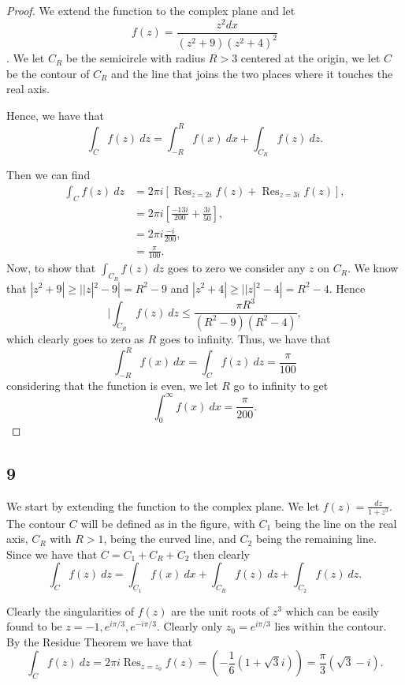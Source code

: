\documentclass{article}
\DeclareMathOperator*{\Res}{Res}
\begin{document}
\begin{proof}
    We extend the function to the complex plane and let
    \[f(z) = \frac{z^2 dx}{(z^2 + 9)(z^2 + 4)^2}\]. We let $C_R$ be the
    semicircle with radius $R > 3$ centered at the origin, we let $C$ be the
    contour of $C_R$ and the line that joins the two places where it touches
    the real axis.

    Hence, we have that
    \[\int_C f(z) \ dz = \int_{-R}^R f(x) \ dx + \int_{C_R} f(z) \ dz.\]

    Then we can find
    \begin{align*}
        \int_C f(z) \ dz & = 2\pi i\left[\Res_{z=2i} f(z) + \Res_{z=3i} f(z)\right], \\
                         & =2\pi i\left[\frac{-13i}{200} + \frac{3i}{50}\right],     \\
                         & = 2\pi i \frac{-i}{200},                                  \\
                         & = \frac{\pi}{100}.
    \end{align*}
    Now, to show that $\int_{C_R} f(z) \ dz$ goes to zero we consider any $z$
    on $C_R$. We know that $|z^2 + 9| \geq ||z|^2 - 9| = R^2 - 9$ and
    $|z^2 + 4| \geq ||z|^2 - 4| = R^2 - 4$. Hence
    \[|\int_{C_R} f(z) \ dz \leq \frac{\pi R^3}{(R^2 - 9)(R^2 -4)},\]
    which clearly goes to zero as $R$ goes to infinity. Thus, we have that
    \[\int_{-R}^R f (x) \ dx = \int_C f(z) \ dz = \frac{\pi}{100}\]
    considering that the function is even, we let $R$ go to infinity to get
    \[\int_0^\infty f(x) \ dx = \frac{\pi}{200}.\]
\end{proof}

\subsection*{9}
We start by extending the function to the complex plane. We let
$f(z) = \frac{dz}{1 + z^3}$. The contour $C$ will be defined as
in the figure, with $C_1$ being the line on the real axis, $C_R$ with $R>1$,
being the curved line, and $C_2$ being the remaining line. Since we have
that $C = C_1 + C_R + C_2$ then clearly
\begin{equation}
    \int_C f(z) \ dz = \int_{C_1} f(x) \ dx + \int_{C_R} f(z) \ dz + \int_{C_2} f(z) \ dz.
\end{equation}

Clearly the singularities of $f(z)$ are the unit roots of $z^3$ which
can be easily found to be $z = -1, e^{i\pi/3}, e^{-i\pi/3}$. Clearly
only $z_0 = e^{i\pi/3}$ lies within the contour. By the Residue Theorem
we have that
\[\int_C f(z) \ dz = 2\pi i\Res_{z = z_0} f(z)
    = \left(-\frac{1}{6}(1 + \sqrt{3}i)\right) = \frac{\pi}{3}(\sqrt{3} - i). \]
\end{document}
